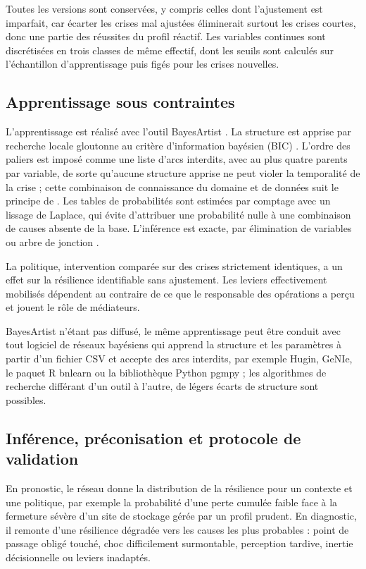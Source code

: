 Toutes les versions sont conservées, y compris celles dont l'ajustement est imparfait, car écarter les crises mal ajustées éliminerait surtout les crises courtes, donc une partie des réussites du profil réactif. Les variables continues sont discrétisées en trois classes de même effectif, dont les seuils sont calculés sur l'échantillon d'apprentissage puis figés pour les crises nouvelles.

\subsection{Apprentissage sous contraintes}
\label{sec:S5.2}

L'apprentissage est réalisé avec l'outil BayesArtist \citep{bayesartist}. La structure est apprise par recherche locale gloutonne au critère d'information bayésien (BIC) \citep{schwarz1978}. L'ordre des paliers est imposé comme une liste d'arcs interdits, avec au plus quatre parents par variable, de sorte qu'aucune structure apprise ne peut violer la temporalité de la crise ; cette combinaison de connaissance du domaine et de données suit le principe de \citet{heckerman1995}. Les tables de probabilités sont estimées par comptage avec un lissage de Laplace, qui évite d'attribuer une probabilité nulle à une combinaison de causes absente de la base. L'inférence est exacte, par élimination de variables ou arbre de jonction \citep{koller2009}.

La politique, intervention comparée sur des crises strictement identiques, a un effet sur la résilience identifiable sans ajustement. Les leviers effectivement mobilisés dépendent au contraire de ce que le responsable des opérations a perçu et jouent le rôle de médiateurs.

BayesArtist n'étant pas diffusé, le même apprentissage peut être conduit avec tout logiciel de réseaux bayésiens qui apprend la structure et les paramètres à partir d'un fichier CSV et accepte des arcs interdits, par exemple Hugin, GeNIe, le paquet R bnlearn ou la bibliothèque Python pgmpy ; les algorithmes de recherche différant d'un outil à l'autre, de légers écarts de structure sont possibles.

\subsection{Inférence, préconisation et protocole de validation}
\label{sec:S5.3}

En pronostic, le réseau donne la distribution de la résilience pour un contexte et une politique, par exemple la probabilité d'une perte cumulée faible face à la fermeture sévère d'un site de stockage gérée par un profil prudent. En diagnostic, il remonte d'une résilience dégradée vers les causes les plus probables : point de passage obligé touché, choc difficilement surmontable, perception tardive, inertie décisionnelle ou leviers inadaptés.

